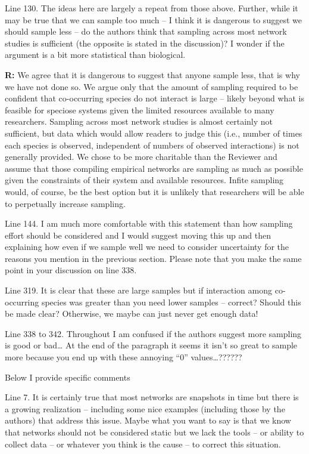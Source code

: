 \documentclass[12pt]{letter}
\begin{document}
	Line 130.  The ideas here are largely a repeat from those above.  Further, while it may be true that we can sample too much – I think it is dangerous to suggest we should sample less – do the authors think that sampling across most network studies is sufficient (the opposite is stated in the discussion)?  I wonder if the argument is a bit more statistical than biological.

	\textbf{R:} We agree that it is dangerous to suggest that anyone sample less, that is why we have not done so. We argue only that the amount of sampling required to be confident that co-occurring species do not interact is large -- likely beyond what is feasible for speciose systems given the limited resources available to many researchers. Sampling across most network studies is almost certainly not sufficient, but data which would allow readers to judge this (i.e., number of times each species is observed, independent of numbers of observed interactions) is not generally provided. We chose to be more charitable than the Reviewer and assume that those compiling empirical networks are sampling as much as possible given the constraints of their system and available resources. Infite sampling would, of course, be the best option but it is unlikely that researchers will be able to perpetually increase sampling.

	Line 144.  I am much more comfortable with this statement than how sampling effort should be considered and I would suggest moving this up and then explaining how even if we sample well we need to consider uncertainty for the reasons you mention in the previous section.  Please note that you make the same point in your discussion on line 338.


	Line 319.  It is clear that these are large samples but if interaction among co-occurring species was greater than you need lower samples – correct?  Should this be made clear?  Otherwise, we maybe can just never get enough data!

	Line 338 to 342.  Throughout I am confused if the authors suggest more sampling is good or bad…  At the end of the paragraph it seems it isn’t so great to sample more because you end up with these annoying “0” values…??????



Below I provide specific comments


	Line 7.  It is certainly true that most networks are snapshots in time but there is a growing realization – including some nice examples (including those by the authors) that address this issue.  Maybe what you want to say is that we know that networks should not be considered static but we lack the tools – or ability to collect data – or whatever you think is the cause – to correct this situation. 
\end{document}
